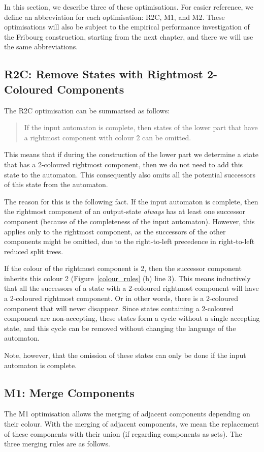 In this section, we describe three of these optimisations. For easier reference, we define an abbreviation for each optimisation: R2C, M1, and M2. These optimisations will also be subject to the empirical performance investigation of the Fribourg construction, starting from the next chapter, and there we will use the same abbreviations.

\subsection{R2C: Remove States with Rightmost 2-Coloured Components}
The R2C optimisation can be summarised as follows:

\begin{quote}
\centering
If the input automaton is complete, then states of the lower part that have a rightmost component with colour 2 can be omitted.
\end{quote}

This means that if during the construction of the lower part we determine a state that has a 2-coloured rightmost component, then we do not need to add this state to the automaton. This consequently also omits all the potential successors of this state from the automaton.

The reason for this is the following fact. If the input automaton is complete, then the rightmost component of an output-state \textit{always} has at least one successor component (because of the completeness of the input automaton). However, this applies only to the rightmost component, as the successors of the other components might be omitted, due to the right-to-left precedence in right-to-left reduced split trees.

If the colour of the rightmost component is 2, then the successor component inherits this colour 2 (Figure~\ref{colour_rules} (b) line 3). This means inductively that all the successors of a state with a 2-coloured rightmost component will have a 2-coloured rightmost component. Or in other words, there is a 2-coloured component that will never disappear. Since states containing a 2-coloured component are non-accepting, these states form a cycle without a single accepting state, and this cycle can be removed without changing the language of the automaton.

Note, however, that the omission of these states can only be done if the input automaton is complete. 


\subsection{M1: Merge Components}
The M1 optimisation allows the merging of adjacent components depending on their colour. With the merging of adjacent components, we mean the replacement of these components with their union (if regarding components as sets). The three merging rules are as follows.


